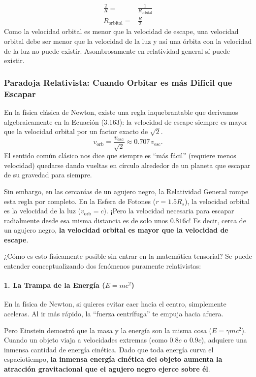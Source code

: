 \documentclass[12pt, a4paper]{article}
\begin{document}
\begin{solution}
\begin{align*}
    \frac{2}{R} =&\frac{1}{R_{\text{orbital}}}\\
    R_{\text{orbital}} =& \frac{R}{2}
\end{align*}
Como la velocidad orbital es menor que la velocidad de escape, una velocidad orbital debe ser menor que la velocidad de la luz y así una órbita con la velocidad de la luz no puede existir. Asombrosamente en relatividad general sí puede existir.

\subsubsection*{Paradoja Relativista: Cuando Orbitar es más Difícil que Escapar}

En la física clásica de Newton, existe una regla inquebrantable que derivamos algebraicamente en la Ecuación (3.163): la velocidad de escape siempre es mayor que la velocidad orbital por un factor exacto de $\sqrt{2}$. 
\begin{equation}
    v_{\text{orb}} = \frac{v_{\text{esc}}}{\sqrt{2}} \approx 0.707 \, v_{\text{esc}}.
\end{equation}
El sentido común clásico nos dice que siempre es ``más fácil'' (requiere menos velocidad) quedarse dando vueltas en círculo alrededor de un planeta que escapar de su gravedad para siempre.

Sin embargo, en las cercanías de un agujero negro, la Relatividad General rompe esta regla por completo. En la Esfera de Fotones ($r = 1.5 R_s$), la velocidad orbital es la velocidad de la luz ($v_{\text{orb}} = c$). ¡Pero la velocidad necesaria para escapar radialmente desde esa misma distancia es de solo unos $0.816 c$! 
Es decir, cerca de un agujero negro, \textbf{la velocidad orbital es mayor que la velocidad de escape}. 

¿Cómo es esto físicamente posible sin entrar en la matemática tensorial? Se puede entender conceptualizando dos fenómenos puramente relativistas:

\paragraph{1. La Trampa de la Energía ($E=mc^2$)}
En la física de Newton, si quieres evitar caer hacia el centro, simplemente aceleras. Al ir más rápido, la ``fuerza centrífuga'' te empuja hacia afuera. 

Pero Einstein demostró que la masa y la energía son la misma cosa ($E=\gamma m c^2$). Cuando un objeto viaja a velocidades extremas (como $0.8c$ o $0.9c$), adquiere una inmensa cantidad de energía cinética. Dado que toda energía curva el espaciotiempo, \textbf{la inmensa energía cinética del objeto aumenta la atracción gravitacional que el agujero negro ejerce sobre él}. 


\end{solution}
\end{document}
